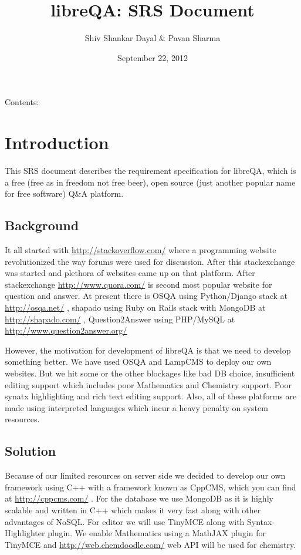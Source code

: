 \documentclass[letterpaper,10pt,english]{sphinxmanual}
\title{libreQA: SRS Document}
\date{September 22, 2012}
\author{Shiv Shankar Dayal \& Pavan Sharma}
\begin{document}
\maketitle
\tableofcontents
{}\label{index::doc}


Contents:


\chapter{Introduction}
\label{intro:introduction}\label{intro::doc}\label{intro:welcome-to-srs-s-documentation}
This SRS document describes the requirement specification for libreQA, which
is a free (free as in freedom not free beer), open source (just another
popular name for free software) Q\&A platform.


\section{Background}
\label{intro:background}
It all started with \href{http://stackoverflow.com/}{http://stackoverflow.com/} where a programming website
revolutionized the way forums were used for discussion. After this
stackexchange was started and plethora of websites came up on that platform.
After stackexchange \href{http://www.quora.com/}{http://www.quora.com/} is second most popular website
for question and answer. At present there is OSQA using Python/Django stack
at \href{http://osqa.net/}{http://osqa.net/} , shapado using Ruby on Rails stack with MongoDB
at \href{http://shapado.com/}{http://shapado.com/} , Question2Answer using PHP/MySQL at
\href{http://www.question2answer.org/}{http://www.question2answer.org/}

However, the motivation for development of libreQA is that we need to develop
something better. We have used OSQA and LampCMS to deploy our own websites.
But we hit some or the other blockages like bad DB choice, insufficient
editing support which includes poor Mathematics and Chemistry support. Poor
synatx highlighting and rich text editing support. Also, all of these platforms
are made using interpreted languages which incur a heavy penalty on system
resources.


\section{Solution}
\label{intro:solution}
Because of our limited resources on server side we decided to develop our own
framework using C++ with a framework known as CppCMS, which you can find at
\href{http://cppcms.com/}{http://cppcms.com/} . For the database we use MongoDB as it is highly scalable
and written in C++ which makes it very fast along with other advantages of
NoSQL. For editor we will use TinyMCE along with Syntax-Highlighter plugin.
We enable Mathematics using a MathJAX plugin for TinyMCE and
\href{http://web.chemdoodle.com/}{http://web.chemdoodle.com/} web API will be used for chemistry.
\end{document}
